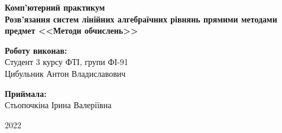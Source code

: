 \begin{titlepage}
    \begin{center}
        \begin{spacing}{1.5}
            \textbf{\Large{Комп'ютерний практикум }} \\
            \vspace{1cm}\textbf{\Large{Розв'язання систем лінійних алгебраїчних рівнянь прямими методами}} \\ 
            \vspace{1cm}\textbf{\large{предмет <<Методи обчислень>>}}
        \end{spacing}
    \end{center}

    \vspace{13em}

    \newlength{\maxname}

    \hfill\parbox{\maxname}{
        \begin{spacing}{1.1}
            \small{\textbf{Роботу виконав:}} \\ 
            \small{Студент 3 курсу ФТІ, групи ФІ-91} \\
            \small{Цибульник Антон Владиславович} \\
        \end{spacing}
    }

    \hfill\parbox{\maxname}{
        \begin{spacing}{1.1}
            \small{\textbf{Приймала:}} \\ 
            \small{Стьопочкіна Ірина Валеріївна} \\
        \end{spacing}
    }

    \vspace{\fill}
    
    \begin{center}
        \small{2022}
    \end{center}
    
\end{titlepage}